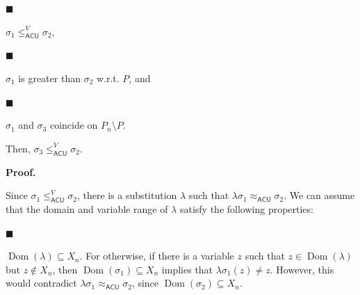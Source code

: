 
\par\noindent  $\blacksquare$ 
 
$\sigma_{1}\leq_{\mathsf{ACU}}^{V}\sigma_{2}$,\par
 
 
 
\par\noindent  $\blacksquare$ 
 
$\sigma_{1}$ is greater than $\sigma_{2}$ w.r.t. $P$, and\par
 
 
 
\par\noindent  $\blacksquare$ 
 
$\sigma_{1}$ and $\sigma_{3}$ coincide on $P_{n}\setminus P$.\par
 
 
  
Then, $\sigma_{3}\leq_{\mathsf{ACU}}^{V}\sigma_{2}$.\par
 
 
 
 
 
\par\medskip\noindent\textbf{Proof.}\par
 
 
Since $\sigma_{1}\leq_{\mathsf{ACU}}^{V}\sigma_{2}$, there is a substitution $\lambda$ such that $\lambda\sigma_{1}\approx_{\mathsf{ACU}}\sigma_{2}$. We can assume that the domain and variable range of $\lambda$ satisfy the following properties:\par
  
\par\noindent  $\blacksquare$ 
 
$\operatorname{Dom}(\lambda)\subseteq X_{n}$. For otherwise, if there is a variable $z$ such that $z\in\operatorname{Dom}(\lambda)$ but $z\not\in X_{n}$, then $\operatorname{Dom}(\sigma_{1})\subseteq X_{n}$ implies that $\lambda\sigma_{1}(z)\neq z$. However, this would contradict $\lambda\sigma_{1}\approx_{\mathsf{ACU}}\sigma_{2}$, since $\operatorname{Dom}(\sigma_{2})\subseteq X_{n}$.\par
 
 
